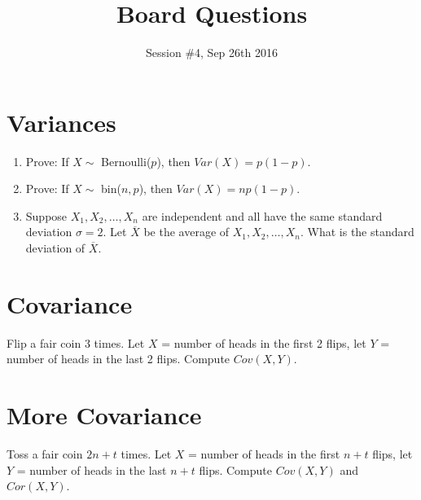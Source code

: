 \documentclass[11p,a4paper]{article}
\title{Board Questions}
\date{Session \#4, Sep 26th 2016}
\begin{document}
\maketitle

\section{Variances}
\begin{enumerate}
\item Prove: If $X \sim $ Bernoulli($p$), then $Var(X)= p(1-p)$.
\item Prove: If $X \sim $ bin($n,p$), then $Var(X)= np(1-p)$.
\item Suppose $X_1,X_2,\ldots,X_n$ are independent and all have the
  same standard deviation $\sigma=2$. Let $\overline{X}$ be the
  average of $X_1,X_2,\ldots,X_n$. What is the standard deviation of $\overline{X}$.
\end{enumerate}

\section{Covariance}
Flip a fair coin 3 times. Let $X$ = number of heads in the first 2
flips, let $Y$ = number of heads in the last 2 flips. Compute $Cov(X,Y)$.

\section{More Covariance}
Toss a fair coin $2n+t$ times. Let $X$ = number of heads in the first $n+t$
flips, let $Y$ = number of heads in the last $n+t$ flips. Compute
$Cov(X,Y)$ and $Cor(X,Y)$.
\end{document}
